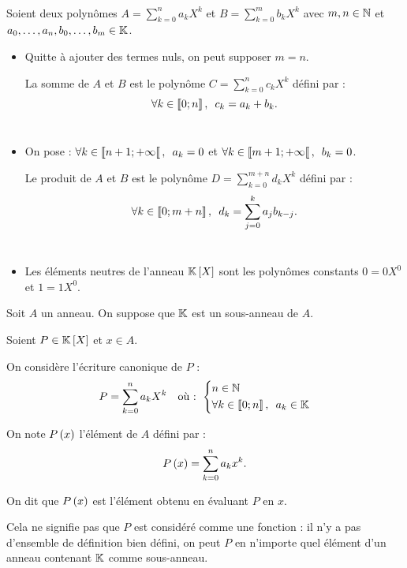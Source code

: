 \begin{rem}~\\
Soient deux polynômes \(A=\sum_{k=0}^na_kX^k\) et \(B=\sum_{k=0}^mb_kX^k\) avec \(m,n\in\mathbb{N}\) et \(a_0,\dots,a_n,b_0,\dots,b_m\in\mathbb{K}\).

\begin{itemize}
\item Quitte à ajouter des termes nuls, on peut supposer \(m=n\).

La somme de \(A\) et \(B\) est le polynôme \(C=\sum_{k=0}^{n}c_kX^k\) défini par : \[\quantifs{\forall k\in\interventierii{0}{n}}c_k=a_k+b_k.\] \\

\item On pose : \(\quantifs{\forall k\in\interventierie{n+1}{\pinf}}a_k=0\) et \(\quantifs{\forall k\in\interventierie{m+1}{\pinf}}b_k=0\).

Le produit de \(A\) et \(B\) est le polynôme \(D=\sum_{k=0}^{m+n}d_kX^k\) défini par : \[\quantifs{\forall k\in\interventierii{0}{m+n}}d_k=\sum_{j=0}^ka_jb_{k-j}.\] \\

\item Les éléments neutres de l'anneau \(\poly\) sont les polynômes constants \(0=0X^0\) et \(1=1X^0\). \\
\end{itemize}
\end{rem}

\begin{nota}
Soit \(A\) un anneau. On suppose que \(\mathbb{K}\) est un sous-anneau de \(A\).

Soient \(P\in\poly\) et \(x\in A\).

On considère l'écriture canonique de \(P\) : \[P=\sum_{k=0}^{n}a_kX^k\quad\text{où : }\begin{dcases}n\in\N \\ \quantifs{\forall k\in\interventierii{0}{n}}a_k\in\K\end{dcases}\]

On note \(P\left(x\right)\) l'élément de \(A\) défini par : \[P\left(x\right)=\sum_{k=0}^na_kx^k.\]

On dit que \(P\left(x\right)\) est l'élément obtenu en évaluant \(P\) en \(x\).

Cela ne signifie pas que \(P\) est considéré comme une fonction : il n'y a pas d'ensemble de définition bien défini, on peut  \(P\) en n'importe quel élément d'un anneau contenant \(\mathbb{K}\) comme sous-anneau.
\end{nota}


